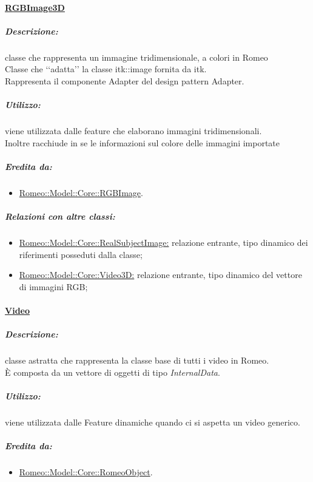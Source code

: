		\paragraph{\underline{RGBImage3D}}
		\label{RGBImage3D}
			
				\subparagraph{Descrizione:} classe che rappresenta un immagine tridimensionale, a colori in Romeo\g{}
						\\Classe che \lq\lq{}adatta\rq\rq{} la classe itk::image fornita da itk.
						\\Rappresenta il componente Adapter del design pattern\g{} Adapter.
						
						\subparagraph{Utilizzo:} viene utilizzata dalle feature\g{} che elaborano immagini tridimensionali.
						\\Inoltre racchiude in se le informazioni sul colore delle immagini importate 
						
						\subparagraph{Eredita da:}
							\begin{itemize}
								\item \hyperref[RGBImage]{Romeo::Model::Core::RGBImage}.
							\end{itemize}
							
						\subparagraph{Relazioni con altre classi:}
							\begin{itemize}
								\item \hyperref[]{Romeo::Model::Core::RealSubjectImage:} relazione entrante, tipo dinamico dei riferimenti posseduti dalla classe;
								\item \hyperref[]{Romeo::Model::Core::Video3D:} relazione entrante, tipo dinamico del vettore di immagini RGB;
							\end{itemize}
				
		\paragraph{\underline{Video}}

			
			\subparagraph{Descrizione:} classe astratta che rappresenta la classe base di tutti i video in Romeo\g{}.
			\\È composta da un vettore di oggetti di tipo \textsl{InternalData}.
			
			\subparagraph{Utilizzo:} viene utilizzata dalle Feature\g{} dinamiche quando ci si aspetta un video generico.
			
			\subparagraph{Eredita da:}
				\begin{itemize}
					\item \hyperref[]{Romeo::Model::Core::RomeoObject}.
				\end{itemize}
				
